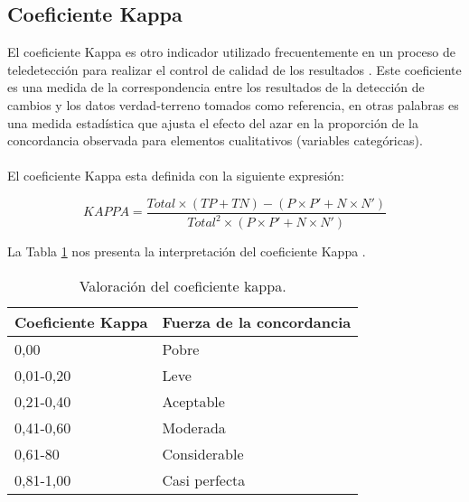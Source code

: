 \subsection{Coeficiente Kappa}\label{sec:kappa}
El coeficiente Kappa es otro indicador utilizado frecuentemente en un proceso de teledetecci\'on para realizar el control de calidad de los resultados \cite{chuvieco1998factor}. Este coeficiente es una medida de la correspondencia entre los resultados de la detecci\'on de cambios y los datos verdad-terreno tomados como referencia, en otras palabras es una medida estad\'istica que ajusta el efecto del azar en la proporci\'on de la concordancia observada para elementos cualitativos (variables categ\'oricas).\\~\\
El coeficiente Kappa esta definida con la siguiente expresi\'on:

		\begin{equation}
		KAPPA=\dfrac{Total \times (TP+TN)-(P \times P'+N \times N')}{Total^{2} \times (P \times P'+N \times N')}
		\end{equation}
		
La Tabla \ref{t:kappaTable} nos presenta la interpretaci\'on del coeficiente Kappa \cite{landis1977measurement}.
		\begin{table}[H]
			\centering
			\begin{tabular}{|l|l|}
				\hline
				\rowcolor[HTML]{EFEFEF} 
				\textbf{Coeficiente Kappa} & \textbf{Fuerza de la concordancia} \\ \hline
				0,00                       & Pobre                              \\ \hline
				0,01-0,20                  & Leve                               \\ \hline
				0,21-0,40                  & Aceptable                          \\ \hline
				0,41-0,60                  & Moderada                           \\ \hline
				0,61-80                    & Considerable                       \\ \hline
				0,81-1,00                  & Casi perfecta                      \\ \hline
			\end{tabular}
						\caption{Valoración del coeficiente kappa.}
						\label{t:kappaTable}
		\end{table}
		


